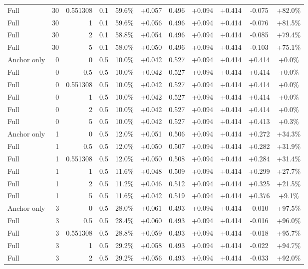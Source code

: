 \begin{table}[htbp]
\begin{tabular}{lrrrccccccc}
Full & 30 & 0.551308 & 0.1 & 59.6\% & +0.057 & 0.496 & +0.094 & +0.414 & -0.075 & +82.0\% \\
Full & 30 & 1 & 0.1 & 59.6\% & +0.056 & 0.496 & +0.094 & +0.414 & -0.076 & +81.5\% \\
Full & 30 & 2 & 0.1 & 58.8\% & +0.054 & 0.496 & +0.094 & +0.414 & -0.085 & +79.4\% \\
Full & 30 & 5 & 0.1 & 58.0\% & +0.050 & 0.496 & +0.094 & +0.414 & -0.103 & +75.1\% \\
Anchor only & 0 & 0 & 0.5 & 10.0\% & +0.042 & 0.527 & +0.094 & +0.414 & +0.414 & +0.0\% \\
Full & 0 & 0.5 & 0.5 & 10.0\% & +0.042 & 0.527 & +0.094 & +0.414 & +0.414 & +0.0\% \\
Full & 0 & 0.551308 & 0.5 & 10.0\% & +0.042 & 0.527 & +0.094 & +0.414 & +0.414 & +0.0\% \\
Full & 0 & 1 & 0.5 & 10.0\% & +0.042 & 0.527 & +0.094 & +0.414 & +0.414 & +0.0\% \\
Full & 0 & 2 & 0.5 & 10.0\% & +0.042 & 0.527 & +0.094 & +0.414 & +0.414 & +0.0\% \\
Full & 0 & 5 & 0.5 & 10.0\% & +0.042 & 0.527 & +0.094 & +0.414 & +0.413 & +0.3\% \\
Anchor only & 1 & 0 & 0.5 & 12.0\% & +0.051 & 0.506 & +0.094 & +0.414 & +0.272 & +34.3\% \\
Full & 1 & 0.5 & 0.5 & 12.0\% & +0.050 & 0.507 & +0.094 & +0.414 & +0.282 & +31.9\% \\
Full & 1 & 0.551308 & 0.5 & 12.0\% & +0.050 & 0.508 & +0.094 & +0.414 & +0.284 & +31.4\% \\
Full & 1 & 1 & 0.5 & 11.6\% & +0.048 & 0.509 & +0.094 & +0.414 & +0.299 & +27.7\% \\
Full & 1 & 2 & 0.5 & 11.2\% & +0.046 & 0.512 & +0.094 & +0.414 & +0.325 & +21.5\% \\
Full & 1 & 5 & 0.5 & 11.6\% & +0.042 & 0.519 & +0.094 & +0.414 & +0.376 & +9.1\% \\
Anchor only & 3 & 0 & 0.5 & 28.0\% & +0.061 & 0.493 & +0.094 & +0.414 & -0.010 & +97.5\% \\
Full & 3 & 0.5 & 0.5 & 28.4\% & +0.060 & 0.493 & +0.094 & +0.414 & -0.016 & +96.0\% \\
Full & 3 & 0.551308 & 0.5 & 28.8\% & +0.059 & 0.493 & +0.094 & +0.414 & -0.018 & +95.7\% \\
Full & 3 & 1 & 0.5 & 29.2\% & +0.058 & 0.493 & +0.094 & +0.414 & -0.022 & +94.7\% \\
Full & 3 & 2 & 0.5 & 29.2\% & +0.056 & 0.493 & +0.094 & +0.414 & -0.033 & +92.0\% \\

\end{tabular}
\end{table}
